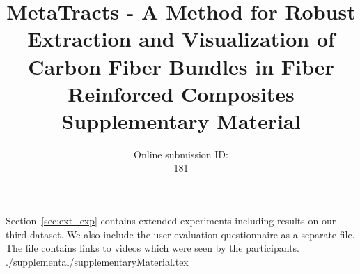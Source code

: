 \documentclass[10pt,a4paper]{article}
\begin{document}
	\title{MetaTracts - A Method for Robust Extraction and Visualization of Carbon Fiber Bundles in Fiber Reinforced Composites \\
		Supplementary Material}
	\author{Online submission ID: \\ 181}
	\maketitle
Section~\ref{sec:ext_exp} contains extended experiments including results on our third dataset.
We also include the user evaluation  questionnaire as a separate file. The file contains links to videos which were seen by the participants. 
 {./supplemental/supplementaryMaterial.tex}
\end{document}

